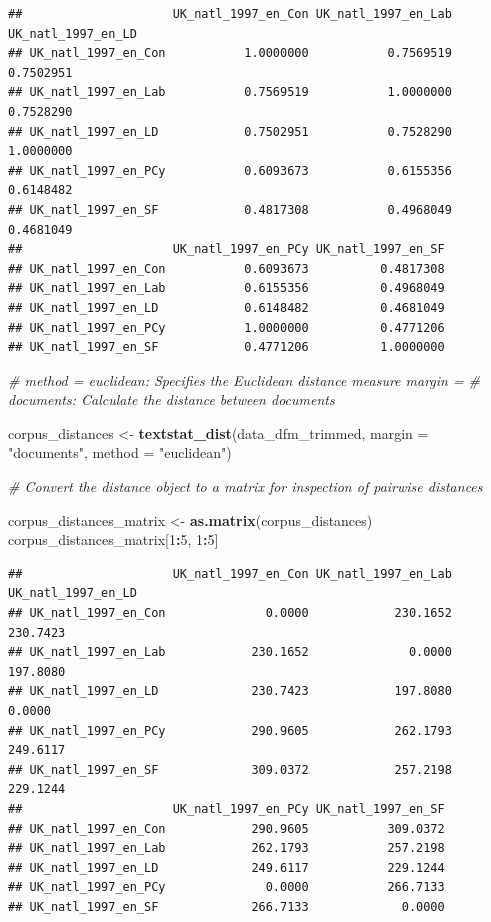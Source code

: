 \documentclass[
]{book}
\newenvironment{Shaded}{\begin{snugshade}}{\end{snugshade}}
\newcommand{\AttributeTok}[1]{\textcolor[rgb]{0.13,0.29,0.53}{#1}}
\newcommand{\CommentTok}[1]{\textcolor[rgb]{0.56,0.35,0.01}{\textit{#1}}}
\newcommand{\DecValTok}[1]{\textcolor[rgb]{0.00,0.00,0.81}{#1}}
\newcommand{\FunctionTok}[1]{\textcolor[rgb]{0.13,0.29,0.53}{\textbf{#1}}}
\newcommand{\NormalTok}[1]{#1}
\newcommand{\OtherTok}[1]{\textcolor[rgb]{0.56,0.35,0.01}{#1}}
\newcommand{\SpecialCharTok}[1]{\textcolor[rgb]{0.81,0.36,0.00}{\textbf{#1}}}
\newcommand{\StringTok}[1]{\textcolor[rgb]{0.31,0.60,0.02}{#1}}
\begin{document}
\begin{verbatim}
##                     UK_natl_1997_en_Con UK_natl_1997_en_Lab UK_natl_1997_en_LD
## UK_natl_1997_en_Con           1.0000000           0.7569519          0.7502951
## UK_natl_1997_en_Lab           0.7569519           1.0000000          0.7528290
## UK_natl_1997_en_LD            0.7502951           0.7528290          1.0000000
## UK_natl_1997_en_PCy           0.6093673           0.6155356          0.6148482
## UK_natl_1997_en_SF            0.4817308           0.4968049          0.4681049
##                     UK_natl_1997_en_PCy UK_natl_1997_en_SF
## UK_natl_1997_en_Con           0.6093673          0.4817308
## UK_natl_1997_en_Lab           0.6155356          0.4968049
## UK_natl_1997_en_LD            0.6148482          0.4681049
## UK_natl_1997_en_PCy           1.0000000          0.4771206
## UK_natl_1997_en_SF            0.4771206          1.0000000
\end{verbatim}

\begin{Shaded}
\begin{Highlighting}[]
\CommentTok{\# method = \textquotesingle{}euclidean\textquotesingle{}: Specifies the Euclidean distance measure margin =}
\CommentTok{\# \textquotesingle{}documents\textquotesingle{}: Calculate the distance between documents}

\NormalTok{corpus\_distances }\OtherTok{\textless{}{-}} \FunctionTok{textstat\_dist}\NormalTok{(data\_dfm\_trimmed, }\AttributeTok{margin =} \StringTok{"documents"}\NormalTok{, }\AttributeTok{method =} \StringTok{"euclidean"}\NormalTok{)}

\CommentTok{\# Convert the distance object to a matrix for inspection of pairwise distances}

\NormalTok{corpus\_distances\_matrix }\OtherTok{\textless{}{-}} \FunctionTok{as.matrix}\NormalTok{(corpus\_distances)}
\NormalTok{corpus\_distances\_matrix[}\DecValTok{1}\SpecialCharTok{:}\DecValTok{5}\NormalTok{, }\DecValTok{1}\SpecialCharTok{:}\DecValTok{5}\NormalTok{]}
\end{Highlighting}
\end{Shaded}

\begin{verbatim}
##                     UK_natl_1997_en_Con UK_natl_1997_en_Lab UK_natl_1997_en_LD
## UK_natl_1997_en_Con              0.0000            230.1652           230.7423
## UK_natl_1997_en_Lab            230.1652              0.0000           197.8080
## UK_natl_1997_en_LD             230.7423            197.8080             0.0000
## UK_natl_1997_en_PCy            290.9605            262.1793           249.6117
## UK_natl_1997_en_SF             309.0372            257.2198           229.1244
##                     UK_natl_1997_en_PCy UK_natl_1997_en_SF
## UK_natl_1997_en_Con            290.9605           309.0372
## UK_natl_1997_en_Lab            262.1793           257.2198
## UK_natl_1997_en_LD             249.6117           229.1244
## UK_natl_1997_en_PCy              0.0000           266.7133
## UK_natl_1997_en_SF             266.7133             0.0000
\end{verbatim}
\end{document}
